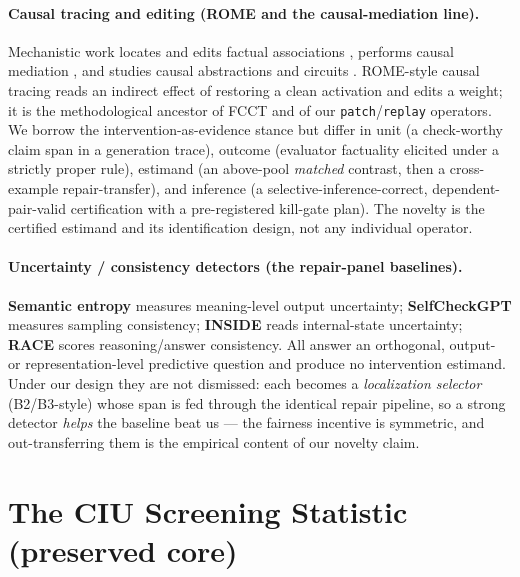 \documentclass[11pt]{article}
\theoremstyle{plain}
\theoremstyle{definition}
\begin{document}
\paragraph{Causal tracing and editing (ROME and the causal-mediation line).}
Mechanistic work locates and edits factual associations
\cite{meng2022rome}, performs causal mediation \cite{vig2020causal}, and studies
causal abstractions and circuits \cite{geiger2021causal,wang2023interpretability}.
ROME-style causal tracing reads an indirect effect of restoring a clean activation
and edits a weight; it is the methodological ancestor of FCCT and of our
\texttt{patch}/\texttt{replay} operators. We borrow the intervention-as-evidence
stance but differ in unit (a check-worthy claim span in a generation trace), outcome
(evaluator factuality elicited under a strictly proper rule), estimand (an
above-pool \emph{matched} contrast, then a cross-example repair-transfer), and
inference (a selective-inference-correct, dependent-pair-valid certification with a
pre-registered kill-gate plan). The novelty is the certified estimand and its
identification design, not any individual operator.

\paragraph{Uncertainty / consistency detectors (the repair-panel baselines).}
\textbf{Semantic entropy} \cite{farquhar2024semantic,kuhn2023semantic} measures
meaning-level output uncertainty; \textbf{SelfCheckGPT}
\cite{manakul2023selfcheckgpt} measures sampling consistency; \textbf{INSIDE}
\cite{chen2024inside} reads internal-state uncertainty; \textbf{RACE}
\cite{race2025reasoning} scores reasoning/answer consistency. All answer an
orthogonal, output- or representation-level predictive question and produce no
intervention estimand. Under our design they are not dismissed: each becomes a
\emph{localization selector} (B2/B3-style) whose span is fed through the identical
repair pipeline, so a strong detector \emph{helps} the baseline beat us --- the
fairness incentive is symmetric, and out-transferring them is the empirical content
of our novelty claim.

\section{The CIU Screening Statistic (preserved core)}\label{sec:ciu}
\end{document}
